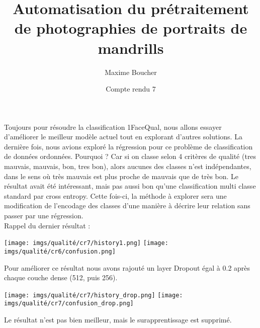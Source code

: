 \documentclass{article}
\title{Automatisation du prétraitement de photographies de portraits de mandrills}
\author{Maxime Boucher}
\date{Compte rendu 7}
\begin{document}
\maketitle

Toujours pour résoudre la classification 1FaceQual, nous allons essayer d'améliorer le meilleur modèle actuel tout en explorant d'autres solutions.
La dernière fois, nous avions exploré la régression pour ce problème de classification de données ordonnées. Pourquoi ? Car si on classe selon 4 critères de qualité (tres mauvais, mauvais, bon, tres bon), alors aucunes des classes n'est indépendantes, dans le sens où très mauvais est plus proche de mauvais que de très bon.
Le résultat avait été intéressant, mais pas aussi bon qu'une classification multi classe standard par cross entropy. Cette fois-ci, la méthode à explorer sera une modification de l'encodage des classes d'une manière à décrire leur relation sans passer par une régression.\\

Rappel du dernier résultat :
\begin{center}
    \texttt{[image: imgs/qualité/cr7/history1.png]}
    \texttt{[image: imgs/qualité/cr6/confusion.png]}
\end{center}

Pour améliorer ce résultat nous avons rajouté un layer Dropout égal à 0.2 après chaque couche dense (512, puis 256).
\begin{center}
    \texttt{[image: imgs/qualité/cr7/history\_drop.png]}
    \texttt{[image: imgs/qualité/cr7/confusion\_drop.png]}
\end{center}

Le résultat n'est pas bien meilleur, mais le surapprentissage est supprimé. \\
\end{document}
